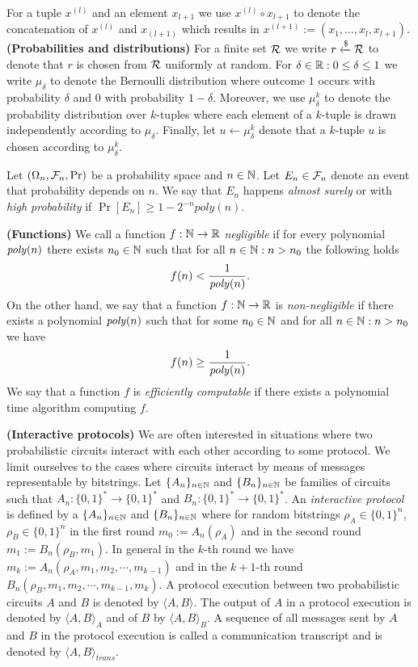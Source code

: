 For a tuple $x^{(l)}$ and an element $x_{l+1}$ we use $x^{(l)} \circ x_{l+1}$ to denote the concatenation of $x^{(l)}$ and $x_{(l+1)}$ which results in
$x^{(l+1)} := (x_1, \dotsc, x_l, x_{l+1})$.
%
\textbf{(Probabilities and distributions)}
For a finite set $\mathcal{R}$ we write $r \xleftarrow{\$} \mathcal{R}$ to denote that $r$ is chosen from $\mathcal{R}$ uniformly at random.
For $\delta \in \mathbb{R} : 0 \leq \delta \leq 1$ we write $\mu_{\delta}$ to denote the Bernoulli distribution where outcome $1$ occurs with
probability $\delta$ and $0$ with probability $1-\delta$.
Moreover, we use $\mu_{\delta}^k$ to denote the probability distribution over $k$-tuples
where each element of a $k$-tuple is drawn independently according to $\mu_{\delta}$.
Finally, let $u \leftarrow \mu_{\delta}^k$ denote that a $k$-tuple $u$ is chosen according to $\mu_{\delta}^k$.

Let $(\Omega_n, \mathcal{F}_n, \Pr)$ be a probability space and $n \in \mathbb{N}$.
Let $E_n \in \mathcal{F}_n$ denote an event that probability depends on $n$.
We say that $E_n$ happens \textit{almost surely} or with \textit{high probability} if $\Pr[E_n] \geq 1 - 2^{-n} \mathit{poly}(n)$.

\textbf{(Functions)} We call a function $f: \mathbb{N} \rightarrow \mathbb{R}$ \textit{negligible} if for every polynomial $\operatorname{\mathit{poly}}(n)$
there exists $n_0 \in \mathbb{N}$ such that for all $n \in \mathbb{N} : n > n_0$ the following holds
\begin{align*}
f(n) < \frac{1}{\operatorname{\mathit{poly}}(n)}.
\end{align*}
On the other hand, we say that a function $f: \mathbb{N} \rightarrow \mathbb{R}$ is \textit{non-negligible} if
there exists a polynomial $\operatorname{\mathit{poly}}(n)$ such that for some $n_0 \in \mathbb{N}$ and for all $n \in \mathbb{N} : n > n_0$ we have
\begin{align*}
  f(n) \geq \frac{1}{\operatorname{\mathit{poly}}(n)}.
\end{align*}
We say that a function $f$ is \textit{efficiently computable} if there exists a polynomial time algorithm computing $f$.

\textbf{(Interactive protocols)}
We are often interested in situations where two probabilistic circuits interact with each other according to some protocol.
We limit ourselves to the cases where circuits interact by means of messages representable by bitstrings.
Let $\{A_n\}_{n \in \mathbb{N}}$ and $\{B_n\}_{n \in \mathbb{N}}$ be families of circuits such that $A_n : \{0,1\}^{*} \rightarrow \{0,1\}^{*}$ and $B_n : \{0,1\}^{*} \rightarrow \{0,1\}^{*}$.
An \textit{interactive protocol} is defined by a $\{A_n\}_{n \in \mathbb{N}}$ and $\{B_n\}_{n \in \mathbb{N}}$ where
for random bitstrings $\rho_A \in \{0,1\}^{n}$, $\rho_B \in \{0,1\}^{n}$ in the first round $m_0 := A_n(\rho_A)$ and in the second round $m_1 := B_n(\rho_B, m_1)$.
In general in the $k$-th round we have $m_k := A_n(\rho_A, m_1, m_2, \cdots, m_{k-1})$ and in the $k+1$-th round $B_n(\rho_B, m_1, m_2, \cdots, m_{k-1}, m_{k})$.
A protocol execution between two probabilistic circuits $A$ and $B$ is denoted by $\langle A, B \rangle$.
The output of $A$ in a protocol execution is denoted by $\langle A, B \rangle_A$ and of $B$ by $\langle A, B \rangle_B$.
A sequence of all messages sent by $A$ and $B$ in the protocol execution is called a communication transcript and
is denoted by $\langle A, B \rangle_{\mathit{trans}}$.

